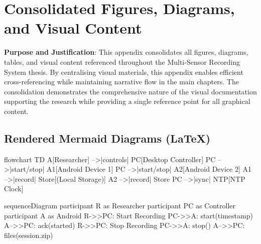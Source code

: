 \chapter{Consolidated Figures, Diagrams, and Visual Content}

\textbf{Purpose and Justification}: This appendix consolidates all figures, diagrams, tables, and visual content referenced throughout the Multi-Sensor Recording System thesis. By centralising visual materials, this appendix enables efficient cross-referencing while maintaining narrative flow in the main chapters. The consolidation demonstrates the comprehensive nature of the visual documentation supporting the research while providing a single reference point for all graphical content.


\section*{Rendered Mermaid Diagrams (LaTeX)}

\begin{mermaid}
flowchart TD
  A[Researcher] -->|controls| PC[Desktop Controller]
  PC -->|start/stop| A1[Android Device 1]
  PC -->|start/stop| A2[Android Device 2]
  A1 -->|record| Store[(Local Storage)]
  A2 -->|record| Store
  PC -->|sync| NTP[NTP Clock]
\end{mermaid}

\begin{mermaid}
sequenceDiagram
  participant R as Researcher
  participant PC as Controller
  participant A as Android
  R->>PC: Start Recording
  PC->>A: start(timestamp)
  A-->>PC: ack(started)
  R->>PC: Stop Recording
  PC->>A: stop()
  A-->>PC: files(session.zip)
\end{mermaid}

